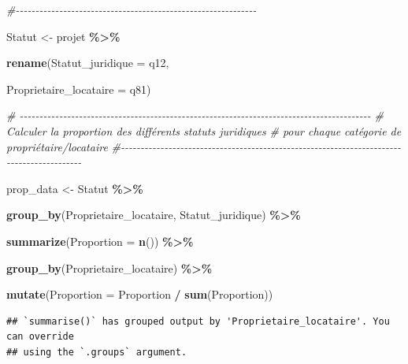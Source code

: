\documentclass[
]{article}
\newenvironment{Shaded}{\begin{snugshade}}{\end{snugshade}}
\newcommand{\AttributeTok}[1]{\textcolor[rgb]{0.13,0.29,0.53}{#1}}
\newcommand{\CommentTok}[1]{\textcolor[rgb]{0.56,0.35,0.01}{\textit{#1}}}
\newcommand{\FunctionTok}[1]{\textcolor[rgb]{0.13,0.29,0.53}{\textbf{#1}}}
\newcommand{\NormalTok}[1]{#1}
\newcommand{\OtherTok}[1]{\textcolor[rgb]{0.56,0.35,0.01}{#1}}
\newcommand{\SpecialCharTok}[1]{\textcolor[rgb]{0.81,0.36,0.00}{\textbf{#1}}}
\begin{document}
\begin{Shaded}
\begin{Highlighting}[]
\CommentTok{\#{-}{-}{-}{-}{-}{-}{-}{-}{-}{-}{-}{-}{-}{-}{-}{-}{-}{-}{-}{-}{-}{-}{-}{-}{-}{-}{-}{-}{-}{-}{-}{-}{-}{-}{-}{-}{-}{-}{-}{-}{-}{-}{-}{-}{-}{-}{-}{-}{-}{-}{-}{-}{-}{-}{-}{-}{-}{-}{-}{-}{-}}

\NormalTok{Statut }\OtherTok{\textless{}{-}}\NormalTok{ projet }\SpecialCharTok{\%\textgreater{}\%}
  
  \FunctionTok{rename}\NormalTok{(}\AttributeTok{Statut\_juridique =}\NormalTok{ q12,}
                           
                           \AttributeTok{Proprietaire\_locataire =}\NormalTok{ q81)}

\CommentTok{\# {-}{-}{-}{-}{-}{-}{-}{-}{-}{-}{-}{-}{-}{-}{-}{-}{-}{-}{-}{-}{-}{-}{-}{-}{-}{-}{-}{-}{-}{-}{-}{-}{-}{-}{-}{-}{-}{-}{-}{-}{-}{-}{-}{-}{-}{-}{-}{-}{-}{-}{-}{-}{-}{-}{-}{-}{-}{-}{-}{-}{-}{-}{-}{-}{-}{-}{-}{-}{-}{-}{-}{-}{-}{-}{-}{-}{-}{-}{-}{-}{-}{-}{-}{-}{-}{-}{-}{-}{-}}
\CommentTok{\#   Calculer la proportion des différents statuts juridiques}
\CommentTok{\#     pour chaque catégorie de propriétaire/locataire}
\CommentTok{\#{-}{-}{-}{-}{-}{-}{-}{-}{-}{-}{-}{-}{-}{-}{-}{-}{-}{-}{-}{-}{-}{-}{-}{-}{-}{-}{-}{-}{-}{-}{-}{-}{-}{-}{-}{-}{-}{-}{-}{-}{-}{-}{-}{-}{-}{-}{-}{-}{-}{-}{-}{-}{-}{-}{-}{-}{-}{-}{-}{-}{-}{-}{-}{-}{-}{-}{-}{-}{-}{-}{-}{-}{-}{-}{-}{-}{-}{-}{-}{-}{-}{-}{-}{-}{-}{-}{-}{-}{-}{-}}

\NormalTok{prop\_data }\OtherTok{\textless{}{-}}\NormalTok{ Statut }\SpecialCharTok{\%\textgreater{}\%}
  
  \FunctionTok{group\_by}\NormalTok{(Proprietaire\_locataire, Statut\_juridique) }\SpecialCharTok{\%\textgreater{}\%}
  
  \FunctionTok{summarize}\NormalTok{(}\AttributeTok{Proportion =} \FunctionTok{n}\NormalTok{()) }\SpecialCharTok{\%\textgreater{}\%}
  
  \FunctionTok{group\_by}\NormalTok{(Proprietaire\_locataire) }\SpecialCharTok{\%\textgreater{}\%}
  
  \FunctionTok{mutate}\NormalTok{(}\AttributeTok{Proportion =}\NormalTok{ Proportion }\SpecialCharTok{/} \FunctionTok{sum}\NormalTok{(Proportion))}
\end{Highlighting}
\end{Shaded}

\begin{verbatim}
## `summarise()` has grouped output by 'Proprietaire_locataire'. You can override
## using the `.groups` argument.
\end{verbatim}
\end{document}
